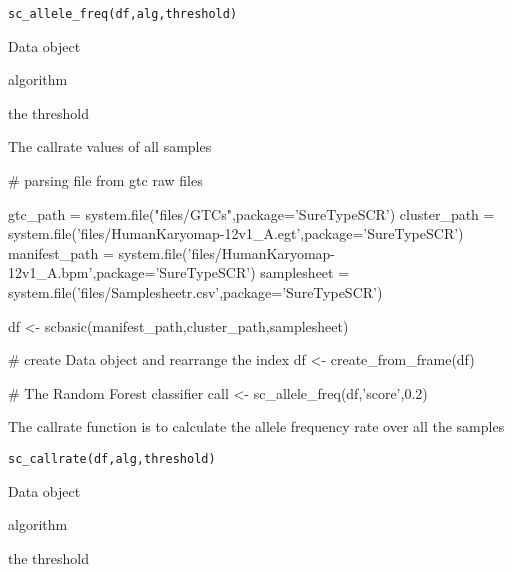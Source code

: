 \documentclass[a4paper]{book}
\begin{document}
%
\begin{Usage}
\begin{verbatim}
sc_allele_freq(df,alg,threshold)
\end{verbatim}
\end{Usage}
%
\begin{Arguments}
\begin{ldescription}
\item[\code{df}] Data object
\item[\code{alg}] algorithm
\item[\code{threshold}] the threshold
\end{ldescription}
\end{Arguments}
%
\begin{Value}
The callrate values of all samples 
\end{Value}
%
\begin{Examples}
\begin{ExampleCode}

# parsing file from gtc raw files

gtc_path = system.file("files/GTCs",package='SureTypeSCR')
cluster_path = system.file('files/HumanKaryomap-12v1_A.egt',package='SureTypeSCR')
manifest_path = system.file('files/HumanKaryomap-12v1_A.bpm',package='SureTypeSCR')
samplesheet = system.file('files/Samplesheetr.csv',package='SureTypeSCR')

df <- scbasic(manifest_path,cluster_path,samplesheet)


# create Data object and rearrange the index
df <- create_from_frame(df)

# The Random Forest classifier
call <- sc_allele_freq(df,'score',0.2) 




\end{ExampleCode}
\end{Examples}
%
\begin{Description}\relax
The callrate function is to calculate the allele frequency rate over all the samples
\end{Description}
%
\begin{Usage}
\begin{verbatim}
sc_callrate(df,alg,threshold)
\end{verbatim}
\end{Usage}
%
\begin{Arguments}
\begin{ldescription}
\item[\code{df}] Data object
\item[\code{alg}] algorithm
\item[\code{threshold}] the threshold
\end{ldescription}
\end{Arguments}
\end{document}
